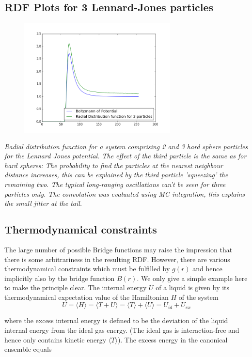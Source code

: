\documentclass[11pt,a4paper]{article}
\begin{document}
\subsection{RDF Plots for 3 Lennard-Jones particles }
\begin{figure}[htb]
\centering
\includegraphics[width=8cm]{rdfLJ3P.png}
\end{figure}
\textit{Radial distribution function for a system comprising 2 and 3 hard sphere particles for the Lennard Jones potential.
The effect of the third particle is the same as for hard spheres: The probability to find the particles at the nearest
neighbour distance increases, this can be explained by the third particle 'squeezing' the remaining two. The typical long-ranging
oscillations can't be seen for three particles only. \newline The convolution was evaluated using MC integration, this explains
the small jitter at the tail.}


\subsection{Thermodynamical constraints }
The large number of possible Bridge functions may raise the impression that there is some arbitrariness in
the resulting RDF. However, there are various thermodynamical constraints which must be fulfilled by 
$g(r)$ and hence implicitly also by the bridge function $B(r)$. We only give a simple example here to make
the principle clear. \newline
The internal energy $U$ of a liquid is given by its thermodynamical expectation value of the Hamiltonian $H$
of the system
\begin{equation}
U = \langle H \rangle = \langle T + U  \rangle
=
\langle T \rangle + \langle U  \rangle =
U_{id} + U_{ex} 
\end{equation}

where the excess internal energy is defined to be the deviation of the liquid internal energy from the ideal gas energy. 
(The ideal gas is interaction-free and hence only contains kinetic energy $\langle T \rangle$). The excess energy
in the canonical ensemble equals
\end{document}
